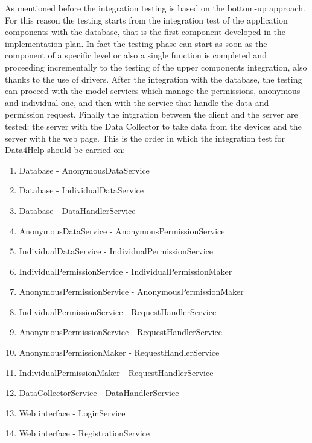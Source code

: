 \documentclass[a4paper]{article}
\begin{document}
\noindent As mentioned before the integration testing is based on the bottom-up approach. For this reason the testing starts from the integration test of the application components with the database, that is the first component developed in the implementation plan.
In fact the testing phase can start as soon as the component of a specific level or also a single function is completed and proceeding incrementally to the testing of the upper components integration, also thanks to the use of drivers.
After the integration with the database, the testing can proceed with the model services which manage the permissions, anonymous and individual one, and then with the service that handle the data and permission request. Finally the intgration between the client and the server are tested: the server with the Data Collector to take data from the devices and the server with the web page.
\newline \newline This is the order in which the integration test for Data4Help should be carried on:


\begin{enumerate}[label*=\bf{\arabic*} . ]
    \item Database - AnonymousDataService
    \item Database - IndividualDataService
    \item Database - DataHandlerService
    \item AnonymousDataService - AnonymousPermissionService
    \item IndividualDataService - IndividualPermissionService
    \item IndividualPermissionService - IndividualPermissionMaker
    \item AnonymousPermissionService - AnonymousPermissionMaker
    \item IndividualPermissionService - RequestHandlerService
    \item AnonymousPermissionService - RequestHandlerService
    \item AnonymousPermissionMaker - RequestHandlerService
    \item IndividualPermissionMaker - RequestHandlerService
    \item DataCollectorService - DataHandlerService
    \item Web interface - LoginService
    \item Web interface - RegistrationService
\end{enumerate}
\end{document}
